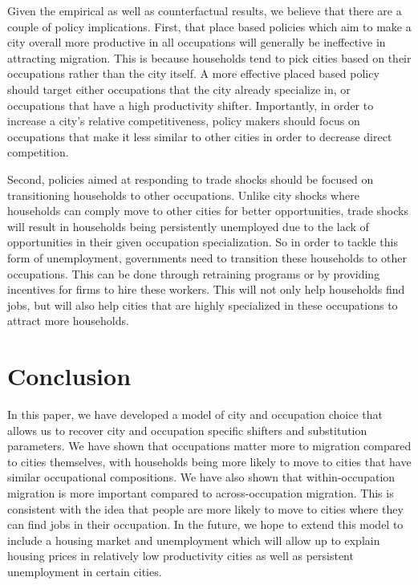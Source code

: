 \documentclass[10pt]{article}
\begin{document}
Given the empirical as well as counterfactual results, we believe that there are a couple of policy implications. First, that place based policies which aim to make a city overall more productive in all occupations will generally be ineffective in attracting migration. This is because households tend to pick cities based on their occupations rather than the city itself. A more effective placed based policy should target either occupations that the city already specialize in, or occupations that have a high productivity shifter. Importantly, in order to increase a city's relative competitiveness, policy makers should focus on occupations that make it less similar to other cities in order to decrease direct competition.

Second, policies aimed at responding to trade shocks should be focused on transitioning households to other occupations. Unlike city shocks where households can comply move to other cities for better opportunities, trade shocks will result in households being persistently unemployed due to the lack of opportunities in their given occupation specialization. So in order to tackle this form of unemployment, governments need to transition these households to other occupations. This can be done through retraining programs or by providing incentives for firms to hire these workers. This will not only help households find jobs, but will also help cities that are highly specialized in these occupations to attract more households.

\section{Conclusion}

In this paper, we have developed a model of city and occupation choice that allows us to recover city and occupation specific shifters and substitution parameters. We have shown that occupations matter more to migration compared to cities themselves, with households being more likely to move to cities that have similar occupational compositions. We have also shown that within-occupation migration is more important compared to across-occupation migration. This is consistent with the idea that people are more likely to move to cities where they can find jobs in their occupation. In the future, we hope to extend this model to include a housing market and unemployment which will allow up to explain housing prices in relatively low productivity cities as well as persistent unemployment in certain cities.
\end{document}
